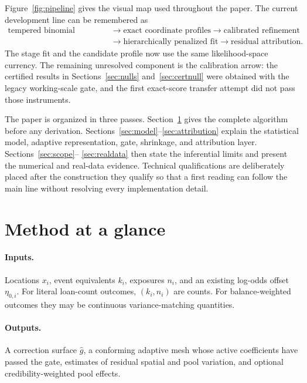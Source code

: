 \documentclass[11pt]{article}
\begin{document}
Figure~\ref{fig:pipeline} gives the visual map used throughout the paper. The current
development line can be remembered as
\[
\begin{aligned}
\text{tempered binomial objective}
&\longrightarrow \text{exact coordinate profiles}
\longrightarrow \text{calibrated refinement}\\
&\longrightarrow \text{hierarchically penalized fit}
\longrightarrow \text{residual attribution}.
\end{aligned}
\]
The stage fit and the candidate profile now use the same likelihood-space currency. The
remaining unresolved component is the calibration arrow: the certified results in
Sections~\ref{sec:nulls} and~\ref{sec:certnull} were obtained with the legacy
working-scale gate, and the first exact-score transfer attempt did not pass those
instruments.

The paper is organized in three passes. Section~\ref{sec:overview} gives the complete algorithm before
any derivation. Sections~\ref{sec:model}--\ref{sec:attribution} explain the statistical model,
adaptive representation, gate, shrinkage, and attribution layer. Sections~\ref{sec:scope}--
\ref{sec:realdata} then state the inferential limits and present the numerical and real-data evidence.
Technical qualifications are deliberately placed after the construction they qualify so that a first
reading can follow the main line without resolving every implementation detail.

\section{Method at a glance}\label{sec:overview}

\paragraph{Inputs.} Locations $x_i$, event equivalents $k_i$, exposures $n_i$, and an existing
log-odds offset $\eta_{0,i}$. For literal loan-count outcomes, $(k_i,n_i)$ are counts. For
balance-weighted outcomes they may be continuous variance-matching quantities.

\paragraph{Outputs.} A correction surface $\hat g$, a conforming adaptive mesh whose active
coefficients have passed the gate, estimates of residual spatial and pool variation, and optional
credibility-weighted pool effects.
\end{document}
